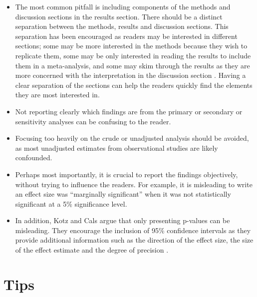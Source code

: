 \documentclass[
]{book}
\providecommand{\tightlist}{%
  \setlength{\itemsep}{0pt}\setlength{\parskip}{0pt}}
\begin{document}
\begin{itemize}
\tightlist
\item
  The most common pitfall is including components of the methods and discussion sections in the results section. There should be a distinct separation between the methods, results and discussion sections. This separation has been encouraged as readers may be interested in different sections; some may be more interested in the methods because they wish to replicate them, some may be only interested in reading the results to include them in a meta-analysis, and some may skim through the results as they are more concerned with the interpretation in the discussion section \citep[p.99-119]{heard2016scientist}. Having a clear separation of the sections can help the readers quickly find the elements they are most interested in.
\item
  Not reporting clearly which findings are from the primary or secondary or sensitivity analyses can be confusing to the reader.
\item
  Focusing too heavily on the crude or unadjusted analysis should be avoided, as most unadjusted estimates from observational studies are likely confounded.
\item
  Perhaps most importantly, it is crucial to report the findings objectively, without trying to influence the readers. For example, it is misleading to write an effect size was ``marginally significant'' when it was not statistically significant at a 5\% significance level.
\item
  In addition, Kotz and Cals argue that only presenting p-values can be misleading. They encourage the inclusion of 95\% confidence intervals as they provide additional information such as the direction of the effect size, the size of the effect estimate and the degree of precision \citep{kotz2013effective5}.
\end{itemize}

\hypertarget{tips-3}{%
\section{Tips}\label{tips-3}}
\end{document}
